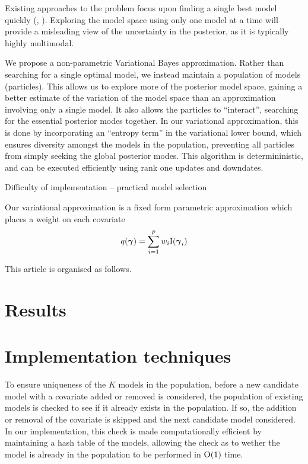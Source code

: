 \documentclass{amsart}[12pt]
\begin{document}
Existing approaches to the problem focus upon finding a single best model quickly (\cite{You2014},
\cite{Rockova2014}). Exploring the model space using only one model at a time will provide a misleading view
of the uncertainty in the posterior, as it is typically highly multimodal.

\cite{Rockova2016}
We propose a non-parametric Variational Bayes approximation. Rather than searching for a single optimal model,
we instead maintain a population of models (particles). This allows us to explore more of the posterior model
space, gaining a better estimate of the variation of the model space than an approximation involving only a
single model. It also allows the particles to ``interact'', searching for the essential posterior modes
together. In our variational approximation, this is done by incorporating an ``entropy term'' in the
variational lower bound, which ensures diversity amongst the models in the population, preventing all
particles from simply seeking the global posterior modes. This algorithm is determininistic, and can be
executed efficiently using rank one updates and downdates.

Difficulty of implementation -- practical model selection
\cite{Chipman2014}

Our variational approximation is a fixed form parametric approximation which places a weight on each covariate
\[
	q({\boldsymbol \gamma}) = \sum_{i=1}^p w_i \text{I}({\boldsymbol \gamma}_i)
\]


This article is organised as follows.

\section{Results}


\section{Implementation techniques}
To ensure uniqueness of the $K$ models in the population, before a new candidate model with a covariate added
or removed is considered, the population of existing models is checked to see if it already exists in the
population. If so, the addition or removal of the covariate is skipped and the next candidate model considered.
In our implementation, this check is made computationally efficient by maintaining a hash table of the models,
allowing the check as to wether the model is already in the population to be performed in $\text{O}(1)$ time.



\end{document}
